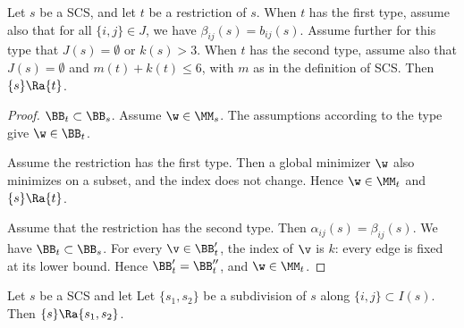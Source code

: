 

\begin{lemma}[restriction]
Let $s$ be a SCS, and let $t$ be a restriction of $s$.
When $t$ has the first type, assume also that for all $\{ i , j\} \in J$, we have $\beta_{i j}(s) = b_{i j}(s)$.
Assume further for this type that $J(s)=\emptyset$ or $k(s)>3$.
When $t$ has the second type, assume also that $J(s)=\emptyset$ and $m(t)+k(t)\le 6$, with $m$ as in
the definition of SCS.
Then $\{s\}\Ra \{t\}$.
\end{lemma}

\begin{proof}
$\BB_t\subset \BB_s$. Assume
 $\w\in \MM_s$. The assumptions  according to the type give $\w\in \BB_t$.

Assume the restriction has the first type.  Then a global minimizer $\w$ also
minimizes on a subset,  and the index does not change.  Hence $\w\in \MM_t$ and $\{s\}\Ra\{t\}$.

Assume that the restriction has the second type. Then 
 $\alpha_{ij}(s)=\beta_{ij}(s)$.    We have $\BB_t\subset \BB_s$.
For every $\v\in \BB'_t$, the index of $\v$ is $k$: every edge is fixed at its lower bound.
Hence $\BB'_t = \BB''_t$, and $\w\in \MM_t$.
\end{proof}


\begin{lemma}[subdivision]
Let $s$ be a SCS and let
Let $\{s_1,s_2\}$ be a subdivision of $s$ along $\{i,j\}\subset I(s)$.
Then $\{s\}\Ra\{s_1,s_2\}$.
\end{lemma}

